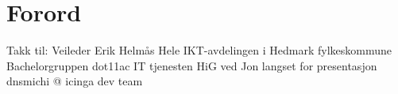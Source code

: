 \chapter{Forord}
	Takk til:
    Veileder Erik Helmås
    Hele IKT-avdelingen i Hedmark fylkeskommune
    Bachelorgruppen dot11ac
    IT tjenesten HiG ved Jon langset for presentasjon
    dnsmichi @ icinga dev team



